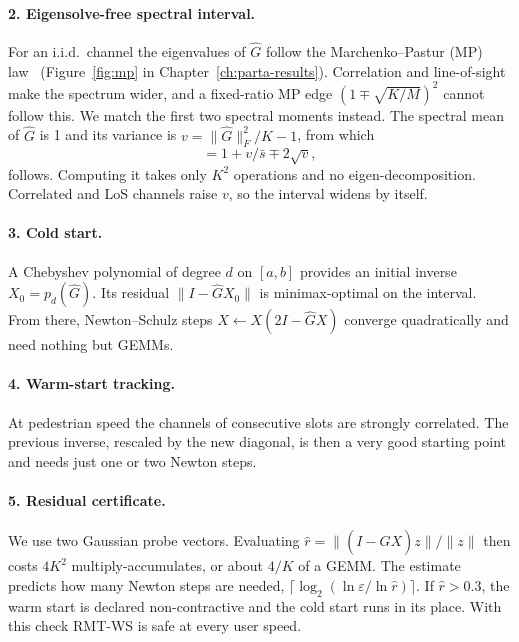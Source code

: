\paragraph{2. Eigensolve-free spectral interval.} For an i.i.d.\ channel the eigenvalues of $\hat G$ follow the Marchenko--Pastur (MP) law~\cite{marchenko1967} (Figure~\ref{fig:mp} in Chapter~\ref{ch:parta-results}). Correlation and line-of-sight make the spectrum wider, and a fixed-ratio MP edge $(1\mp\sqrt{K/M})^2$ cannot follow this. We match the first two spectral moments instead. The spectral mean of $\hat G$ is 1 and its variance is $v = \|\hat G\|_F^2/K - 1$, from which
\begin{equation}
  [a,b] = 1 + v/\bar s \mp 2\sqrt{v},
\end{equation}
follows. Computing it takes only $K^2$ operations and no eigen-decomposition. Correlated and LoS channels raise $v$, so the interval widens by itself.

\paragraph{3. Cold start.} A Chebyshev polynomial of degree $d$ on $[a,b]$ provides an initial inverse $X_0 = p_d(\hat G)$. Its residual $\|I - \hat G X_0\|$ is minimax-optimal on the interval. From there, Newton--Schulz steps $X \leftarrow X(2I - \hat G X)$ converge quadratically and need nothing but GEMMs.

\paragraph{4. Warm-start tracking.} At pedestrian speed the channels of consecutive slots are strongly correlated. The previous inverse, rescaled by the new diagonal, is then a very good starting point and needs just one or two Newton steps.

\paragraph{5. Residual certificate.} We use two Gaussian probe vectors. Evaluating $\hat r = \|(I - \hat G X)z\|/\|z\|$ then costs $4K^2$ multiply-accumulates, or about $4/K$ of a GEMM. The estimate predicts how many Newton steps are needed, $\lceil \log_2(\ln\varepsilon / \ln \hat r)\rceil$. If $\hat r > 0.3$, the warm start is declared non-contractive and the cold start runs in its place. With this check RMT-WS is safe at every user speed.

